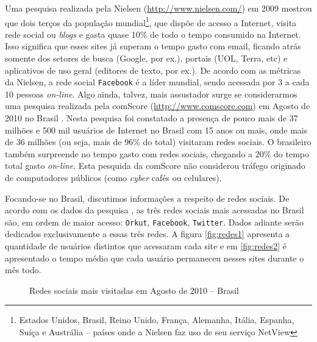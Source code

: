 \documentclass[12pt]{article}
\begin{document}
Uma pesquisa realizada pela Nielsen (\url{http://www.nielsen.com/}) em
2009 \cite{nielsen1} mostrou que dois terços da população
mundial\footnote{Estados Unidos, Brasil, Reino Unido, França,
  Alemanha, Itália, Espanha, Suíça e Austrália -- países onde a Nielsen
  faz uso de seu serviço NetView}, que
dispõe de acesso a Internet, visita rede social ou
\textit{blogs} e gasta quase 10\% de todo o tempo consumido na
Internet. Isso significa que esses sites já superam o tempo gasto com
email, ficando atrás somente dos setores de busca (Google, por ex.),
portais (UOL, Terra, etc) e
aplicativos de uso geral (editores de texto, por ex.). De acordo com
as métricas da Nielsen, a rede social \texttt{Facebook} é a líder
mundial, sendo acessada por 3 a cada 10 pessoas \textit{on-line}.
Algo ainda, talvez,
mais assustador surge se considerarmos uma pesquisa realizada pela
comScore (\url{http://www.comscore.com}) em Agosto de 2010 no Brasil
\cite{comscore1}. Nesta pesquisa foi constatado a presença de pouco
mais de 37 milhões e 500 mil usuários de Internet no Brasil com 15
anos ou mais, onde mais de 36 milhões (ou seja, mais de 96\% do total)
visitaram redes sociais. O brasileiro também surpreende no tempo gasto
com redes sociais, chegando a 20\% do tempo total gasto
\textit{on-line}. Esta pesquida da comScore não considerou tráfego
originado de computadores públicos (como \textit{cyber} cafés ou celulares).

Focando-se no Brasil, discutimos informações a respeito de redes
sociais. De acordo com os dados da pesquisa \cite{comscore1}, as três
redes sociais mais acessadas no Brasil são, em ordem de maior acesso:
\texttt{Orkut}, \texttt{Facebook}, \texttt{Twitter}. Dados adiante serão
dedicados exclusivamente a essas três redes. A figura \ref{fig:redes1}
apresenta a quantidade de usuários distintos que
acessaram cada site e em \ref{fig:redes2} é apresentado o tempo médio
que cada usuário permaneceu nesses sites durante o mês todo.

\begin{figure}[ht]
  \centering
  \qquad
  \caption{Redes sociais mais visitadas em Agosto de 2010 -- Brasil \label{fig:dados1}}
\end{figure}
\end{document}
